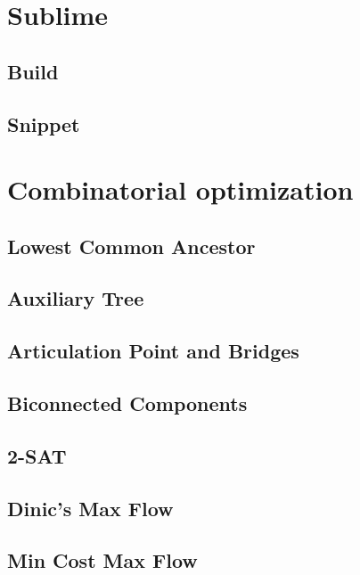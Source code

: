 \section{Sublime}
\subsection{	Build}
\raggedbottom
\hrulefill
\subsection{	Snippet}
\raggedbottom
\hrulefill

\section{Combinatorial optimization}
\subsection{Lowest Common Ancestor}
\raggedbottom
\hrulefill
\subsection{Auxiliary Tree}
\raggedbottom
\hrulefill
\subsection{Articulation Point and Bridges}
\raggedbottom
\hrulefill
\subsection{Biconnected Components}
\raggedbottom
\hrulefill
\subsection{	2-SAT}
\raggedbottom
\hrulefill
\subsection{Dinic's Max Flow}
\raggedbottom
\hrulefill
\subsection{	Min Cost Max Flow}
\raggedbottom
\hrulefill
